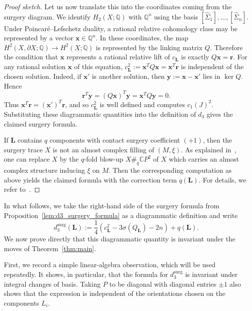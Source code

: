 \documentclass{amsart}
\numberwithin{equation}{section}
\numberwithin{figure}{section}
\theoremstyle{definition}
\theoremstyle{remark}
\let\oldSigma\Sigma
\renewcommand{\Sigma}{\oldSigma}
\let\olddxi\xi %
\renewcommand{\xi}{\olddxi}
\begin{document}
\begin{proof}[Proof sketch]
Let us now translate this into the coordinates coming from the surgery diagram. We identify \(H_2(X;\mathbb Q)\) with \(\mathbb Q^n\) using the basis \([\widehat{\Sigma}_1],\ldots,[\widehat{\Sigma}_n]\). Under Poincaré--Lefschetz duality, a rational relative cohomology class may be represented by a vector \(\boldsymbol x\in\mathbb Q^n\). In these coordinates, the map \(H^2(X,\partial X;\mathbb Q)\to H^2(X;\mathbb Q)\) is represented by the linking matrix \(Q\). Therefore the condition that \(\boldsymbol x\) represents a rational relative lift of \(c_{\boldsymbol L}\) is exactly $Q\boldsymbol x=\boldsymbol r$.
For any rational solution $\boldsymbol{x}$ of this equation, $c_{\boldsymbol L}^2
:=
\boldsymbol x^TQ\boldsymbol x
=
\boldsymbol x^T\boldsymbol r
$ is independent of the chosen solution. Indeed, if \(\boldsymbol x'\) is another solution, then \(\boldsymbol y:=\boldsymbol x-\boldsymbol x'\) lies in \(\ker Q\). Hence
\[
\boldsymbol r^T\boldsymbol y
=
(Q\boldsymbol x)^T\boldsymbol y
=
\boldsymbol x^TQ\boldsymbol y
=
0.
\]
Thus \(\boldsymbol x^T\boldsymbol r=(\boldsymbol x')^T\boldsymbol r\), and so \(c_{\boldsymbol L}^2\) is well defined and computes $c_1(J)^2$. Substituting these diagrammatic quantities into the definition of $d_3$ gives the claimed surgery formula.

If $\boldsymbol{L}$ contains $q$ components with contact surgery coefficient $(+1)$, then the surgery trace $X$ is not an almost complex filling of $(M,\xi)$. As explained in~\cite{Ding_Geiges_Stipsicz}, one can replace $X$ by the $q$-fold blow-up $X\#_q\mathbb C P^2$ of $X$ which carries an almost complex structure inducing $\xi$ on $M$. Then the corresponding computation as above yields the claimed formula with the correction term $q(\boldsymbol{L})$. For details, we refer to~\cite{Ding_Geiges_Stipsicz}.
\end{proof}

In what follows, we take the right-hand side of the surgery formula from Proposition~\ref{lem:d3_surgery_formula} as a diagrammatic definition and write
\[
d_3^{\mathrm{surg}}(\boldsymbol L)
:=
\frac14\left(c_{\boldsymbol L}^2-3\sigma(Q_{\boldsymbol L})-2n\right)
+q(\boldsymbol L).
\]
We now prove directly that this diagrammatic quantity is invariant under the moves of Theorem~\ref{thm:main}.

First, we record a simple linear-algebra observation, which will be used repeatedly. It shows, in particular, that the formula for \(d_3^{\mathrm{surg}}\) is invariant under integral changes of basis. Taking \(P\) to be diagonal with diagonal entries \(\pm1\) also shows that the expression is independent of the orientations chosen on the components \(L_i\).
\end{document}
